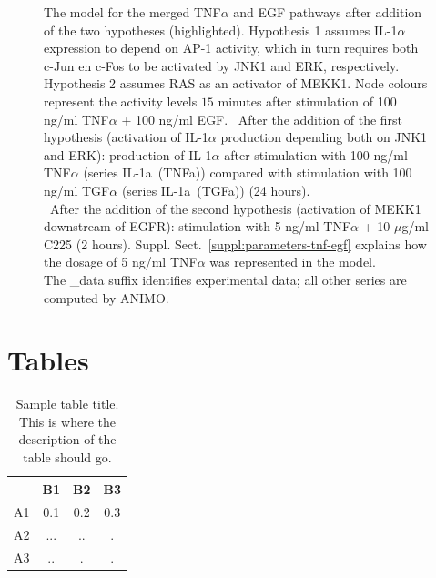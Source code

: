 \documentclass{bmcart}
\begin{document}
\begin{backmatter}
\begin{figure}[!tpb]
\begin{center}
\end{center}
\caption{\scriptsize
{\bf \protect{}} The model for the merged TNF$\alpha$ and EGF pathways
after addition of the two hypotheses (highlighted).
Hypothesis 1 assumes IL-1$\alpha$ expression to depend on AP-1 activity, which in turn requires
both c-Jun en c-Fos to be activated by JNK1 and ERK, respectively. Hypothesis 2 assumes RAS as an activator
of MEKK1. Node colours represent the activity levels $15$ minutes
after stimulation of 100 ng/ml TNF$\alpha$ + 100 ng/ml EGF.
{\bf \protect{}}~After the addition of the first hypothesis (activation of IL-1$\alpha$ production depending both
on JNK1 and ERK): production of IL-1$\alpha$ after stimulation with 100 ng/ml TNF$\alpha$ (series {\sf IL-1a~(TNFa)})
compared with stimulation with 100 ng/ml TGF$\alpha$ (series {\sf IL-1a~(TGFa)}) (24 hours).\\
{\bf \protect{}}~After the addition of the second hypothesis (activation of MEKK1 downstream of EGFR):
stimulation with 5 ng/ml TNF$\alpha$ + 10 $\mu$g/ml C225 (2 hours).
Suppl. Sect.~\ref{suppl:parameters-tnf-egf} explains how the dosage of 5 ng/ml TNF$\alpha$ was represented in the model.\\
The {\sf \_{}data} suffix identifies experimental data; all other series are computed by ANIMO.}\label{fig:large-model-graph}
\end{figure}



\section*{Tables}
\begin{table}[h!]
\caption{Sample table title. This is where the description of the table should go.}
      \begin{tabular}{cccc}
        \hline
           & B1  &B2   & B3\\ \hline
        A1 & 0.1 & 0.2 & 0.3\\
        A2 & ... & ..  & .\\
        A3 & ..  & .   & .\\ \hline
      \end{tabular}
\end{table}


\end{backmatter}
\end{document}
